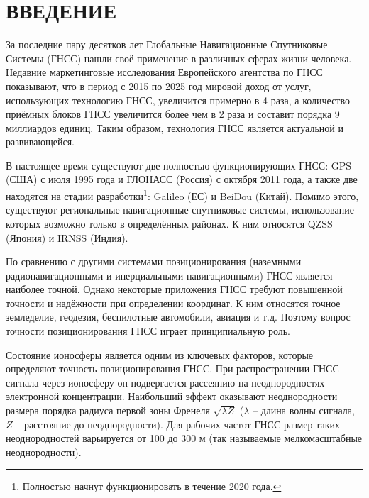 \newpage
{}
{}
\chapter*{ВВЕДЕНИЕ} 

За последние пару десятков лет Глобальные Навигационные Спутниковые Системы (ГНСС) нашли своё применение в различных сферах жизни человека.
Недавние маркетинговые исследования Европейского агентства по ГНСС \cite{1} показывают, что в период с 2015 по 2025 год мировой доход от услуг, использующих технологию ГНСС, увеличится примерно в 4 раза, а количество приёмных блоков ГНСС увеличится более чем в 2 раза и составит порядка 9 миллиардов единиц. 
Таким образом, технология ГНСС является актуальной и развивающейся.

В настоящее время существуют две полностью функционирующих ГНСС: GPS (США) с июля 1995 года и ГЛОНАСС (Россия) с октября 2011 года, а также две находятся на стадии разработки\footnote{Полностью начнут функционировать в течение 2020 года.}: Galileo (ЕС) и BeiDou (Китай).
Помимо этого, существуют региональные навигационные спутниковые системы, использование которых возможно только в определённых районах.
К ним относятся QZSS (Япония) и IRNSS (Индия).

По сравнению с другими системами позиционирования (наземными радионавигационными и инерциальными навигационными) ГНСС является наиболее точной.
Однако некоторые приложения ГНСС требуют повышенной точности и надёжности при определении координат.
К ним относятся точное земледелие, геодезия, беспилотные автомобили, авиация и т.д.  
Поэтому вопрос точности позиционирования ГНСС играет принципиальную роль.

Состояние ионосферы является одним из ключевых факторов, которые определяют точность позиционирования ГНСС. 
При распространении ГНСС-сигнала через ионосферу он подвергается рассеянию на неоднородностях электронной концентрации. 
Наибольший эффект оказывают неоднородности размера порядка радиуса первой зоны Френеля $\sqrt{\lambda Z}$ ($\lambda$ -- длина волны сигнала, $Z$ -- расстояние до неоднородности). 
Для рабочих частот ГНСС размер таких неоднородностей варьируется от 100 до 300 м (так называемые мелкомасштабные неоднородности). 

